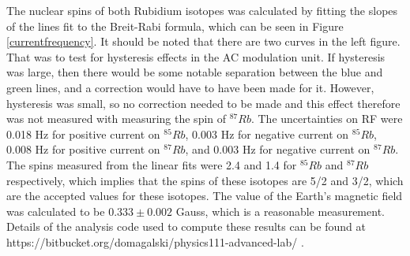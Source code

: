 \documentclass[11pt,letterpaper]{article}
\begin{document}
The nuclear spins of both Rubidium isotopes was calculated by fitting the slopes
of the lines fit to the Breit-Rabi formula, which can be seen in Figure
\ref{currentfrequency}. It should be noted that there are two curves in the left
figure. That was to test for hysteresis effects in the AC modulation unit. If
hysteresis was large, then there would be some notable separation between the
blue and green lines, and a correction would have to have been made for it.
However, hysteresis was small, so no correction needed to be made and this
effect therefore was not measured with measuring the spin of $^{87}Rb$. The
uncertainties on RF were 0.018 Hz for positive current on $^{85}Rb$, 0.003 Hz
for negative current on $^{85}Rb$, 0.008 Hz for positive current on $^{87}Rb$,
and 0.003 Hz for negative current on $^{87}Rb$. The spins measured from the
linear fits were 2.4 and 1.4 for $^{85}Rb$ and $^{87}Rb$ respectively, which
implies that the spins of these isotopes are 5/2 and 3/2, which are the accepted
values for these isotopes. The value of the Earth's magnetic field was
calculated to be $0.333 \pm 0.002$ Gauss, which is a reasonable measurement.
Details of the analysis code used to compute these results can be found at
https://bitbucket.org/domagalski/physics111-advanced-lab/ \cite{Bitbucket}.


{}
\end{document}
